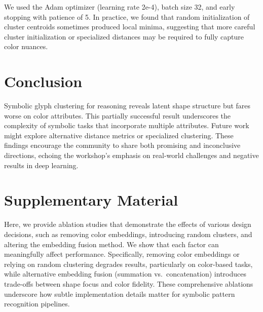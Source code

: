 \documentclass{article} %
\theoremstyle{plain}
\theoremstyle{definition}
\theoremstyle{remark}
\begin{document}
We used the Adam optimizer (learning rate 2e-4), batch size 32, and early stopping with patience of 5. In practice, we found that random initialization of cluster centroids sometimes produced local minima, suggesting that more careful cluster initialization or specialized distances may be required to fully capture color nuances.

\section{Conclusion}
\label{sec:conclusion}
Symbolic glyph clustering for reasoning reveals latent shape structure but fares worse on color attributes. This partially successful result underscores the complexity of symbolic tasks that incorporate multiple attributes. Future work might explore alternative distance metrics or specialized clustering. These findings encourage the community to share both promising and inconclusive directions, echoing the workshop's emphasis on real-world challenges and negative results in deep learning.




\appendix

\section*{\LARGE Supplementary Material}
\label{sec:appendix}
Here, we provide ablation studies that demonstrate the effects of various design decisions, such as removing color embeddings, introducing random clusters, and altering the embedding fusion method. We show that each factor can meaningfully affect performance. Specifically, removing color embeddings or relying on random clustering degrades results, particularly on color-based tasks, while alternative embedding fusion (summation vs.\ concatenation) introduces trade-offs between shape focus and color fidelity. These comprehensive ablations underscore how subtle implementation details matter for symbolic pattern recognition pipelines.
\end{document}
